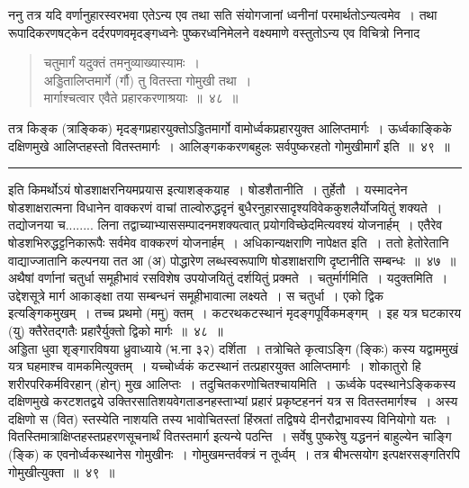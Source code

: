 \documentclass[11pt, openany]{book}
\begin{document}
ननु तत्र यदि वर्णानुहारस्वरभवा एतेऽन्य एव तथा सति संयोगजानां ध्वनीनां {\qtt परमार्थतोऽन्यत्वमेव}~। तथा रूपादिकरणषट्केन दर्दरपणवमृदङ्गध्वनेः पुष्करध्वनिमेलने वक्ष्यमाणे वस्तुतोऽन्य एव विचित्रो निनाद 

\newpage

\begin{quote}
{\na  चतुमार्गं यदुक्तं तमनुव्याख्यास्यामः~।\\
 अड्डितालिप्तमार्गे (र्गौ) तु वितस्ता गोमुखी तथा~।\\
 मार्गाश्चत्वार एवैते प्रहारकरणाश्रयाः~॥~४८~॥}
\end{quote}

{\qt तत्र किङ्क (त्राङ्किक) मृदङ्गप्रहारयुक्तोऽड्डितमार्गो वामोर्ध्वकप्रहारयुक्त आलिप्तमार्गः~। ऊर्ध्वकाङ्किके दक्षिणमुखे आलिप्तहस्तो वितस्तमार्गः~। आलिङ्गककरणबहुलः सर्वपुष्करहतो गोमुखीमार्गं इति~॥~४९~॥}

\vspace{2mm}
\hrule

\vspace{2mm}
इति किमर्थोऽयं षोडशाक्षरनियमप्रयास इत्याशङ्कयाह~। {\qtt षोडशैतानीति}~। {\qtt तुर्हेतौ}~। यस्मादनेन षोडशाक्षरात्मना विधानेन वाक्करणं वाचां ताल्वोरुद्धदृनं बुधैरनुहारसादृश्यविवेककुशलैर्योजयितुं शक्यते~। तद्योजनया च........ लिना तद्वाच्याभ्याससम्पादनमशक्यत्वात् प्रयोगविच्छेदमित्यवश्यं योजनार्हम्~। एतैरेव षोडशभिरुद्धट्टनिकारूपैः सर्वमेव वाक्करणं योजनार्हम्~। अधिकान्यक्षराणि नापेक्षत इति~। ततो हेतोरेतानि वाद्याज्जातानि कल्पनया तत आ (अ) पोद्धारेण लब्धस्वरूपाणि षोडशाक्षराणि दृष्टानीति सम्बन्धः~॥~४७~॥\\

अथैषां वर्णानां चतुर्धा समूहीभावं रसविशेष उपयोजयितुं दर्शयितुं प्रक्मते~। {\qtt चतुर्मार्गमिति~। यदुक्तमिति~।} उद्देशसूत्रे मार्ग आकाङ्क्षा तया सम्बन्धनं समूहीभावात्मा लक्ष्यते~। स चतुर्धा~। एको द्विक इत्यङ्गिकमुखम्~। तच्च प्रथमो (ममु) क्तम्~। कटरथकटस्थानं मृदङ्गपूर्विकमङ्गम्~। इह यत्र घटकारय (यु) क्तैरेतद्गतैः प्रहारैर्युक्तो द्विको मार्गः~॥~४८~॥\\

अड्डिता धुवा शृङ्गारविषया ध्रुवाध्याये (भ.ना ३२) दर्शिता~। तत्रोचिते कृत्वाऽङ्गि (ङ्किः) कस्य यद्वाममुखं यत्र घहमाश्च वामकमित्युक्तम्~। यच्चोर्ध्वकं कटस्थानं तत्प्रहारयुक्त आलिप्तमार्गः~। शोकातुरो हि शरीरपरिकर्मविरहान् (होन्) मुख आलिप्तः~। {\qtt तदुचितकरणोचितश्चायमिति}~। ऊर्ध्वके पदस्थानेऽङ्किकस्य दक्षिणमुखे करटशतद्वये उक्तिरसातिशयवेगताडनहस्ताभ्यां प्रहारं प्रकृष्टहननं यत्र स वितस्तमार्गश्च~। अस्य दक्षिणो स (वित) स्तस्येति नाशयति तस्य भावोचितस्तां हिंस्रतां तद्विषये दीनरौद्राभावस्य विनियोगो यतः~। वितस्तिमात्राक्षिप्तहस्तप्रहरणसूचनार्थं वितस्तमार्ग इत्यन्ये पठन्ति~। सर्वेषु पुष्करेषु यद्धननं बाहुल्येन चाङ्गि (ङ्कि) क एवनोर्ध्वकस्थानेस गोमुखीनः~। गोमुखमन्तर्वक्त्रं न तूर्ध्वम्~। तत्र बीभत्सयोग इत्पक्षरसङ्गतिरपि गोमुखीत्युक्ता~॥~४९~॥
\end{document}
